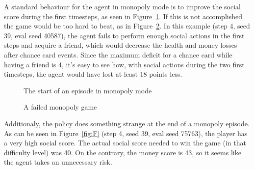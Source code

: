 \documentclass{article}
\begin{document}
A standard behaviour for the agent in monopoly mode is to improve the social score during the first timesteps, as seen in Figure~\ref{fig:A}. If this is not accomplished the game would be too hard to beat, as in Figure~\ref{fig:E}. In this example (step 4, seed 39, eval seed 40587), the agent fails to perform enough social actions in the first steps and acquire a friend, which would decrease the health and money losses after chance card events. Since the maximum deficit for a chance card while having a friend is 4, it's easy to see how, with social actions during the two first timesteps, the agent would have lost at least 18 points less. 

\begin{figure}
  \centering
  \caption{The start of an episode in monopoly mode}
  \label{fig:A}
\end{figure}

\begin{figure}
  \centering
  \caption{A failed monopoly game}
  \label{fig:E}
\end{figure} 

Additionaly, the policy does something strange at the end of a monopoly episode. As can be seen in Figure~\ref{fig:F} (step 4, seed 39, eval seed 75763), the player has a very high social score. The actual social score needed to win the game (in that difficulty level) was 40. On the contrary, the money score is 43, so it seems like the agent takes an unnecessary risk.
\end{document}
